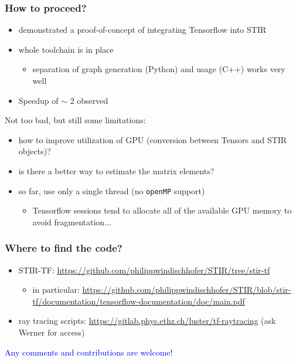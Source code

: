 \documentclass{beamer}
\begin{document}
\begin{frame}
  \frametitle{How to proceed?}
  \begin{itemize}
    \item demonstrated a proof-of-concept of integrating Tensorflow into STIR
    \item whole toolchain is in place
      \begin{itemize}
        \item separation of graph generation (Python) and usage (C++) works very well
      \end{itemize}
      \pause
    \item Speedup of $\sim$ 2 observed
  \end{itemize}

  Not too bad, but still some limitations:
  \begin{itemize}
  \item how to improve utilization of GPU (conversion between Tensors and STIR objects)?
    \pause
  \item is there a better way to estimate the matrix elements?
    \pause
    \item so far, use only a single thread (no \texttt{openMP} support)
      \begin{itemize}
        \item Tensorflow sessions tend to allocate all of the available GPU memory to avoid fragmentation...
      \end{itemize}
  \end{itemize}
\end{frame}

\begin{frame}
  \frametitle{Where to find the code?}
  \begin{itemize}
    \item STIR-TF: \url{https://github.com/philippwindischhofer/STIR/tree/stir-tf}
      \begin{itemize}
        \item in particular: \url{https://github.com/philippwindischhofer/STIR/blob/stir-tf/documentation/tensorflow-documentation/doc/main.pdf}
      \end{itemize}
    \item ray tracing scripts: \url{https://gitlab.phys.ethz.ch/luster/tf-raytracing} (ask Werner for access)
  \end{itemize}

  \begin{center}
    \textcolor{blue}{Any comments and contributions are welcome!}
  \end{center}
\end{frame}
\end{document}
